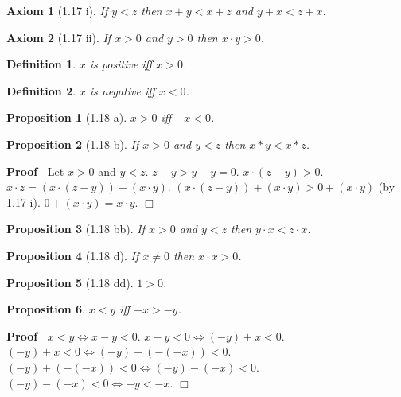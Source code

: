 \documentclass{article}
\newenvironment{forthel}{\begin{leftbar}}{\end{leftbar}}
\newenvironment{proof}{\noindent\textbf{Proof\ }}{\hspace*{\fill}$\Box$\medskip}
\newtheorem{axiom}{Axiom}
\newtheorem{definition}{Definition}
\newtheorem{proposition}{Proposition}
\begin{document}
\begin{forthel}

\begin{axiom}[1.17 i] If $y < z$ then $x + y < x + z$ and $y + x < z + x$.
\end{axiom}

\begin{axiom}[1.17 ii] If $x > 0$ and $y > 0$ then $x \cdot y > 0$.
\end{axiom}

\begin{definition} $x$ is \emph{positive} iff $x > 0$.
\end{definition}

\begin{definition} $x$ is \emph{negative} iff $x < 0$.
\end{definition}


\begin{proposition}[1.18 a] $x > 0$ iff $-x < 0$. \end{proposition}

\begin{proposition}[1.18 b] If $x > 0$ and $y < z$ then $x * y < x * z$.
\end{proposition}
\begin{proof} Let $x > 0$ and $y < z$.
$z - y > y - y = 0$.
$x \cdot (z - y) > 0$.
$x \cdot z = (x \cdot (z - y)) + (x \cdot y)$.
$(x \cdot (z - y)) + (x \cdot y)  > 0 + (x \cdot y)$ (by 1.17 i).
$0 + (x \cdot y) = x \cdot y$.
\end{proof}

\begin{proposition}[1.18 bb] If $x > 0$ and $y < z$ then 
$y \cdot x < z \cdot x$.
\end{proposition}

\begin{proposition}[1.18 d] If $x \neq 0$ then $x \cdot x > 0$.
\end{proposition}


\begin{proposition}[1.18 dd] $1 > 0$.\end{proposition}

\begin{proposition} $x < y$ iff $-x > -y$.\end{proposition}
\begin{proof}
$x < y \Leftrightarrow x - y < 0$. 
$x - y < 0 \Leftrightarrow (-y) + x < 0$. 
$(-y) + x < 0 \Leftrightarrow (-y)+(-(-x)) < 0$.
$(-y)+(-(-x)) < 0 \Leftrightarrow (-y)-(-x) < 0$.
$(-y)-(-x) < 0 \Leftrightarrow -y < -x$.
\end{proof}


\end{forthel}
\end{document}
